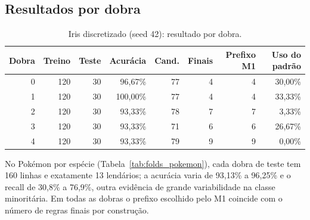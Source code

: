 \documentclass[a4paper,11pt]{article}
\begin{document}
\subsection{Resultados por dobra}
\begin{table}[htbp]
\centering
\small
\caption{Iris discretizado (seed 42): resultado por dobra.}
\label{tab:folds_iris}
\begin{tabular}{rrrrrrrr}
\toprule
Dobra & Treino & Teste & Acurácia & Cand. & Finais & Prefixo M1 & Uso do padrão \\
\midrule
0 & 120 & 30 & 96,67\% & 77 & 4 & 4 & 30,00\% \\
1 & 120 & 30 & 100,00\% & 77 & 4 & 4 & 33,33\% \\
2 & 120 & 30 & 93,33\% & 78 & 7 & 7 & 3,33\% \\
3 & 120 & 30 & 93,33\% & 71 & 6 & 6 & 26,67\% \\
4 & 120 & 30 & 93,33\% & 79 & 9 & 9 & 0,00\% \\
\bottomrule
\end{tabular}
\end{table}

No Pok\'emon por esp\'ecie (Tabela~\ref{tab:folds_pokemon}), cada dobra de teste tem 160 linhas e exatamente 13 lend\'arios; a acur\'acia varia de 93,13\% a 96,25\% e o recall de 30,8\% a 76,9\%, outra evid\^encia de grande variabilidade na classe minorit\'aria. Em todas as dobras o prefixo escolhido pelo M1 coincide com o n\'umero de regras finais por constru\c{c}\~ao.

\end{document}
